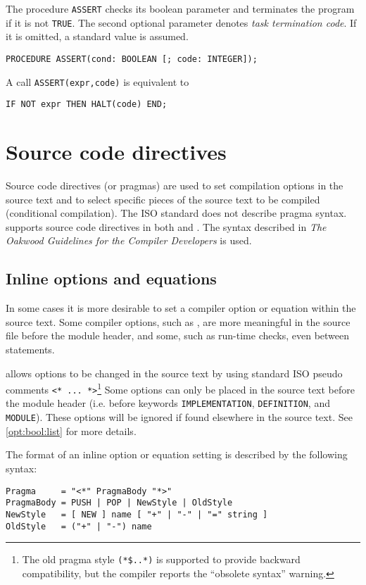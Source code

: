 The procedure \verb'ASSERT' checks its boolean parameter and terminates
the program if it is not \verb'TRUE'. The second optional parameter
denotes {\em task termination code}. If it is omitted, a standard value
is assumed.

\verb'PROCEDURE ASSERT(cond: BOOLEAN [; code: INTEGER]);'

A call \verb|ASSERT(expr,code)| is equivalent to

\verb'IF NOT expr THEN HALT(code) END;'

\section{Source code directives}\label{m2:pragmas}

Source code directives (or pragmas) are used to set compilation
options in the source text and to select specific pieces of the source
text to be compiled (conditional compilation).
The ISO \mt{} standard does not describe pragma syntax.
\XDS{} supports source code directives
in both \mt{} and \ot{}. The syntax described in
{\em The Oakwood Guidelines for the \ot{} Compiler Developers}
is used.

\subsection{Inline options and equations}\label{m2:pragmas:inline}

In some cases it is more desirable to set a compiler option or
equation within the source  text. Some compiler options,  such as
, are more meaningful in the source file before the
module header, and some, such as run-time checks, even between statements.

\xds{} allows options to be changed in the source text by using standard
ISO  pseudo comments \verb|<* ... *>|\footnote{The old pragma style
{\tt (*\$..*)} is supported to provide backward compatibility,
but the compiler reports the ``obsolete syntax'' warning.}
Some options can only be placed in the source text before the module
header (i.e. before keywords \verb'IMPLEMENTATION', \verb'DEFINITION',
and \verb'MODULE'). These options will be ignored if found elsewhere
in the source text. See \ref{opt:bool:list} for more details.

The format of an inline option or equation setting is described by
the following syntax:
\begin{verbatim}
Pragma     = "<*" PragmaBody "*>"
PragmaBody = PUSH | POP | NewStyle | OldStyle
NewStyle   = [ NEW ] name [ "+" | "-" | "=" string ]
OldStyle   = ("+" | "-") name
\end{verbatim}

